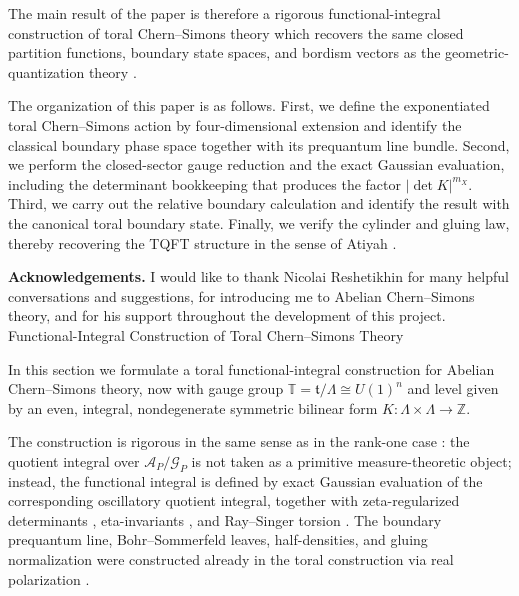 \documentclass[12pt]{amsart}
\makeatletter
\renewcommand\section{\@startsection{section}{1}%
  \z@{.7\linespacing\@plus\linespacing}{.5\linespacing}%
  {\normalfont\bfseries\centering}}
\numberwithin{equation}{section}
\makeatother
\begin{document}
The main result of the paper is therefore a rigorous functional-integral construction of toral
Chern--Simons theory which recovers the same closed partition functions, boundary state
spaces, and bordism vectors as the geometric-quantization theory \cite{Galviz2}.

The organization of this paper is as follows. First, we define the exponentiated toral Chern--Simons action
by four-dimensional extension and identify the classical boundary phase space together with
its prequantum line bundle. Second, we perform the closed-sector gauge reduction and the
exact Gaussian evaluation, including the determinant bookkeeping that produces the factor
$|\det K|^{m_X}$. Third, we carry out the relative boundary calculation and identify the
result with the canonical toral boundary state. Finally, we verify the cylinder  and  gluing law, thereby recovering the TQFT structure in the sense of Atiyah \cite{Atiyah:1989vu}.

\textbf{Acknowledgements.} I would like to thank Nicolai Reshetikhin for many helpful conversations and suggestions, for introducing me to Abelian Chern–Simons theory, and for his support throughout the development of this project.
\section{Functional-Integral Construction of Toral Chern--Simons Theory}

In this section we formulate a toral  functional-integral construction for Abelian Chern--Simons theory, now with gauge group $\mathbb T=\mathfrak t/\Lambda\cong U(1)^n$ and level given by an even, integral, nondegenerate symmetric bilinear form $K\colon \Lambda\times \Lambda\to \mathbb Z.$

The construction is rigorous in the same sense as in the rank-one case \cite{Manoliu3}:
the quotient integral over \(\mathcal A_P/\mathcal G_P\) is not taken as a primitive
measure-theoretic object; instead, the functional integral is defined by exact Gaussian
evaluation of the corresponding oscillatory quotient integral, together with zeta-regularized
determinants \cite{Seeley67,Ray1971,Schwarz1978}, eta-invariants \cite{Atiyah:1975jf}, and Ray--Singer torsion \cite{Ray1971}. The boundary prequantum line,
Bohr--Sommerfeld leaves, half-densities, and gluing normalization  were constructed already in the toral
construction via real polarization \cite{Galviz2}.
\end{document}
